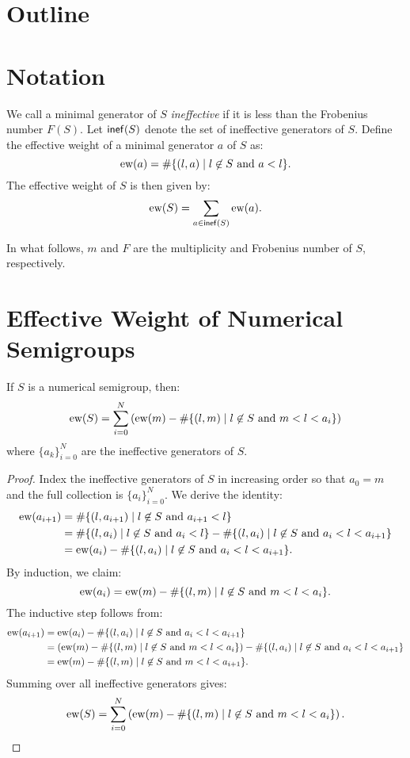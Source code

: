 \documentclass[11pt]{article}
\title{}
\author{Erik Imathiu-Jones}
\begin{document}
\section{Outline}
\begin{tcolorbox}[title=TLDR]
\end{tcolorbox}

\section{Notation}

We call a minimal generator of \(S\) \emph{ineffective} if it is less than the Frobenius number \(F(S)\). Let \(\mathsf{inef}(S)\) denote the set of ineffective generators of \(S\). Define the effective weight of a minimal generator \(a\) of \(S\) as:
\[
\text{ew}(a) = \#\{(l, a) \mid l \not\in S \text{ and } a < l\}.
\]
The effective weight of \(S\) is then given by:
\[
\text{ew}(S) = \sum_{a \in \mathsf{inef}(S)} \text{ew}(a).
\]

In what follows, \(m\) and \(F\) are the multiplicity and Frobenius number of \(S\), respectively.

\section{Effective Weight of Numerical Semigroups}

\begin{proposition}
    If \(S\) is a numerical semigroup, then:
    \[
    \text{ew}(S) = \sum_{i=0}^{N} \left(\text{ew}(m) - \# \{(l, m) \mid l \not\in S \text{ and } m < l < a_i\}\right)
    \]
    where \(\{a_k\}_{i=0}^N\) are the ineffective generators of \(S\).
\end{proposition}

\begin{proof}
Index the ineffective generators of \(S\) in increasing order so that \(a_0 = m\) and the full collection is \(\{a_i\}_{i=0}^N\). We derive the identity:
\begin{align*}
    \text{ew}(a_{i+1}) &= \#\{(l, a_{i+1}) \mid l \not\in S \text{ and } a_{i+1} < l\} \\
    &= \#\{(l, a_i) \mid l \not\in S \text{ and } a_i < l\} - \#\{(l, a_i) \mid l \not\in S \text{ and } a_i < l < a_{i+1}\} \\
    &= \text{ew}(a_i) - \#\{(l, a_i) \mid l \not\in S \text{ and } a_i < l < a_{i+1}\}.
\end{align*}
By induction, we claim:
\[
\text{ew}(a_i) = \text{ew}(m) - \# \{(l, m) \mid l \not\in S \text{ and } m < l < a_i\}.
\]
The inductive step follows from:
\begin{align*}
    \text{ew}(a_{i+1}) &= \text{ew}(a_i) - \#\{(l, a_i) \mid l \not\in S \text{ and } a_i < l < a_{i+1}\} \\
    &= \left(\text{ew}(m) - \# \{(l, m) \mid l \not\in S \text{ and } m < l < a_i\}\right) - \#\{(l, a_i) \mid l \not\in S \text{ and } a_i < l < a_{i+1}\} \\
    &= \text{ew}(m) - \# \{(l, m) \mid l \not\in S \text{ and } m < l < a_{i+1}\}.
\end{align*}
Summing over all ineffective generators gives:
\[
\text{ew}(S) = \sum_{i=0}^{N} \left(\text{ew}(m) - \# \{(l, m) \mid l \not\in S \text{ and } m < l < a_i\}\right).
\]
\end{proof}
\end{document}
